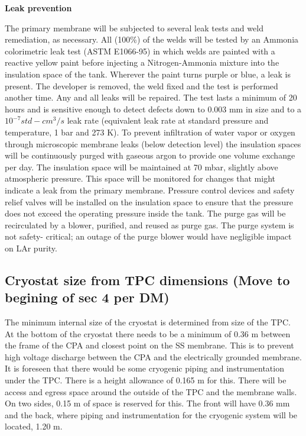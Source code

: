 \textbf{Leak prevention}

The primary membrane will be subjected to several leak tests and weld remediation, as necessary. All 
(100\%) of the welds will be tested by an Ammonia colorimetric leak test (ASTM E1066-95) in which 
welds are painted with a reactive yellow paint before injecting a Nitrogen-Ammonia mixture into the 
insulation space of the tank. Wherever the paint turns purple or blue, a leak is present. The developer is 
removed, the weld fixed and the test is performed another time. Any and all leaks will be repaired. The 
test lasts a minimum of 20 hours and is sensitive enough to detect defects down to 0.003 mm in size 
and to a $10^{-7} std-cm^3/s$ leak rate (equivalent leak rate at standard pressure and temperature, 1 bar and 
273 K). To prevent infiltration of water vapor or oxygen through microscopic membrane leaks (below 
detection level) the insulation spaces will be continuously purged with gaseous argon to provide one 
volume exchange per day. The insulation space will be maintained at 70 mbar, slightly above 
atmospheric pressure. This space will be monitored for changes that might indicate a leak from the 
primary membrane. Pressure control devices and safety relief valves will be installed on the insulation 
space to ensure that the pressure does not exceed the operating pressure inside the tank. The purge gas 
will be recirculated by a blower, purified, and reused as purge gas. The purge system is not safety-
critical; an outage of the purge blower would have negligible impact on LAr purity.

\subsection{Cryostat size from TPC dimensions (Move to begining of sec 4 per DM) }

The minimum internal size of the cryostat is determined from size of the TPC.  At the bottom of the 
cryostat there needs to be a minimum of 0.36 m between the frame of the CPA and closest point on the SS 
membrane.  This is to prevent high voltage discharge between the CPA and the electrically grounded 
membrane. It is foreseen that there would be some cryogenic piping and instrumentation under the TPC.  
There is a height allowance of 0.165 m for this.  There will be access and egress space around the outside 
of the TPC and the membrane walls.  On two sides, 0.15 m of space is reserved for this. The front will have 0.36 mm and the back, where piping and instrumentation for the cryogenic system will be located, 1.20 m.

